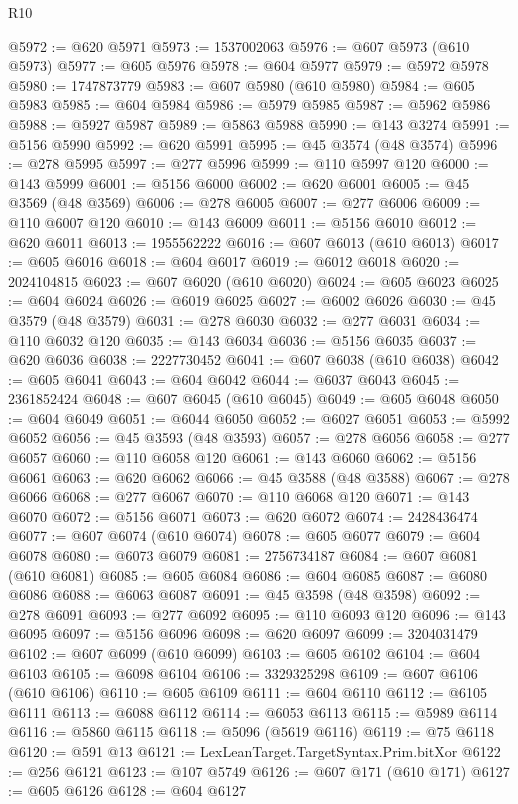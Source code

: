 \begin{lexlean}{R10}
\begin{coremodule}
@5972 := @620 @5971
@5973 := 1537002063
@5976 := @607 @5973 (@610 @5973)
@5977 := @605 @5976
@5978 := @604 @5977
@5979 := @5972 @5978
@5980 := 1747873779
@5983 := @607 @5980 (@610 @5980)
@5984 := @605 @5983
@5985 := @604 @5984
@5986 := @5979 @5985
@5987 := @5962 @5986
@5988 := @5927 @5987
@5989 := @5863 @5988
@5990 := @143 @3274
@5991 := @5156 @5990
@5992 := @620 @5991
@5995 := @45 @3574 (@48 @3574)
@5996 := @278 @5995
@5997 := @277 @5996
@5999 := @110 @5997 @120
@6000 := @143 @5999
@6001 := @5156 @6000
@6002 := @620 @6001
@6005 := @45 @3569 (@48 @3569)
@6006 := @278 @6005
@6007 := @277 @6006
@6009 := @110 @6007 @120
@6010 := @143 @6009
@6011 := @5156 @6010
@6012 := @620 @6011
@6013 := 1955562222
@6016 := @607 @6013 (@610 @6013)
@6017 := @605 @6016
@6018 := @604 @6017
@6019 := @6012 @6018
@6020 := 2024104815
@6023 := @607 @6020 (@610 @6020)
@6024 := @605 @6023
@6025 := @604 @6024
@6026 := @6019 @6025
@6027 := @6002 @6026
@6030 := @45 @3579 (@48 @3579)
@6031 := @278 @6030
@6032 := @277 @6031
@6034 := @110 @6032 @120
@6035 := @143 @6034
@6036 := @5156 @6035
@6037 := @620 @6036
@6038 := 2227730452
@6041 := @607 @6038 (@610 @6038)
@6042 := @605 @6041
@6043 := @604 @6042
@6044 := @6037 @6043
@6045 := 2361852424
@6048 := @607 @6045 (@610 @6045)
@6049 := @605 @6048
@6050 := @604 @6049
@6051 := @6044 @6050
@6052 := @6027 @6051
@6053 := @5992 @6052
@6056 := @45 @3593 (@48 @3593)
@6057 := @278 @6056
@6058 := @277 @6057
@6060 := @110 @6058 @120
@6061 := @143 @6060
@6062 := @5156 @6061
@6063 := @620 @6062
@6066 := @45 @3588 (@48 @3588)
@6067 := @278 @6066
@6068 := @277 @6067
@6070 := @110 @6068 @120
@6071 := @143 @6070
@6072 := @5156 @6071
@6073 := @620 @6072
@6074 := 2428436474
@6077 := @607 @6074 (@610 @6074)
@6078 := @605 @6077
@6079 := @604 @6078
@6080 := @6073 @6079
@6081 := 2756734187
@6084 := @607 @6081 (@610 @6081)
@6085 := @605 @6084
@6086 := @604 @6085
@6087 := @6080 @6086
@6088 := @6063 @6087
@6091 := @45 @3598 (@48 @3598)
@6092 := @278 @6091
@6093 := @277 @6092
@6095 := @110 @6093 @120
@6096 := @143 @6095
@6097 := @5156 @6096
@6098 := @620 @6097
@6099 := 3204031479
@6102 := @607 @6099 (@610 @6099)
@6103 := @605 @6102
@6104 := @604 @6103
@6105 := @6098 @6104
@6106 := 3329325298
@6109 := @607 @6106 (@610 @6106)
@6110 := @605 @6109
@6111 := @604 @6110
@6112 := @6105 @6111
@6113 := @6088 @6112
@6114 := @6053 @6113
@6115 := @5989 @6114
@6116 := @5860 @6115
@6118 := @5096 (@5619 @6116)
@6119 := @75 @6118
@6120 := @591 @13
@6121 := LexLeanTarget.TargetSyntax.Prim.bitXor
@6122 := @256 @6121
@6123 := @107 @5749
@6126 := @607 @171 (@610 @171)
@6127 := @605 @6126
@6128 := @604 @6127

\end{coremodule}
\end{lexlean}
